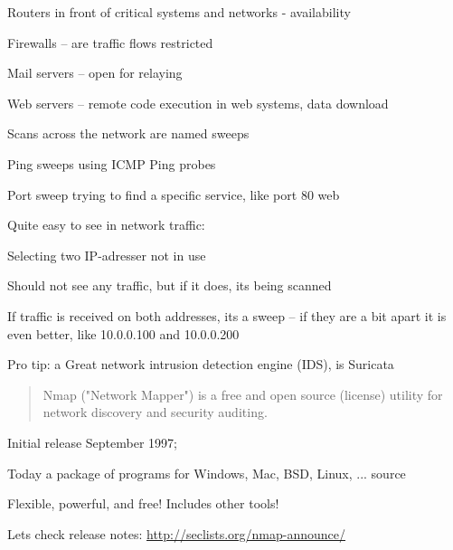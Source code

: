 \documentclass[Screen16to9,17pt]{foils}
\begin{document}


\begin{list2}
\item Routers in front of critical systems and networks - availability
\item Firewalls -- are traffic flows restricted
\item Mail servers -- open for relaying
\item Web servers -- remote code execution in web systems, data download
\end{list2}


\begin{list1}
\item Scans across the network are named sweeps
\item Ping sweeps using ICMP Ping probes
\item Port sweep trying to find a specific service, like port 80 web
\item Quite easy to see in network traffic:
\begin{list2}
\item Selecting two IP-adresser not in use
\item Should not see any traffic, but if it does, its being scanned
\item If traffic is received on both addresses, its a sweep -- if they are a bit apart it is even better, like 10.0.0.100 and 10.0.0.200
  \end{list2}

\vskip 2cm
Pro tip: a Great network intrusion detection engine (IDS), is Suricata 
\end{list1}

\begin{quote}
Nmap ("Network Mapper") is a free and open source (license) utility for network discovery and security auditing.
\end{quote}

\begin{list1}
\item Initial release September 1997;
\item Today a package of programs for Windows, Mac, BSD, Linux, ... source
\item Flexible, powerful, and free! Includes other tools!
\item Lets check release notes: \url{http://seclists.org/nmap-announce/}
\end{list1}
\end{document}
